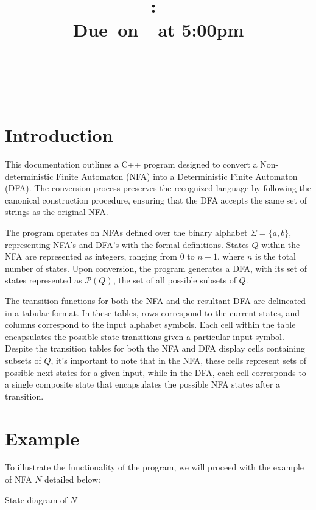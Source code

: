 \documentclass{article}
\title{
    \vspace{2in}
    \textmd{\textbf{\hmwkClass:\ \hmwkTitle}}\\
    \normalsize\vspace{0.1in}\small{Due\ on\ \hmwkDueDate\ at 5:00pm}\\
    \vspace{0.1in}\large{\textit{\hmwkClassInstructor}} \\
    \vspace{3in}
}
\author{
  \hmwkAuthorName \\
  \vspace{0.1in}\small\hmwkPID
}
\date{}
\begin{document}
\maketitle

\pagebreak

\section*{Introduction}

This documentation outlines a C++ program designed to convert a Non-deterministic Finite Automaton
(NFA) into a Deterministic Finite Automaton (DFA). The conversion process preserves the recognized
language by following the canonical construction procedure, ensuring that the DFA accepts the same
set of strings as the original NFA.

The program operates on NFAs defined over the binary alphabet $\Sigma = \{a, b\}$, representing
NFA's and DFA's with the formal definitions. States $Q$ within the NFA are represented as integers,
ranging from 0 to $n - 1$, where $n$ is the total number of states. Upon conversion, the program
generates a DFA, with its set of states represented as $\mathcal{P}(Q)$, the set of all possible
subsets of $Q$.

The transition functions for both the NFA and the resultant DFA are delineated in a tabular format.
In these tables, rows correspond to the current states, and columns correspond to the input alphabet
symbols. Each cell within the table encapsulates the possible state transitions given a particular
input symbol. Despite the transition tables for both the NFA and DFA display cells containing
subsets of $Q$, it's important to note that in the NFA, these cells represent sets of possible next
states for a given input, while in the DFA, each cell corresponds to a single composite state that
encapsulates the possible NFA states after a transition.

\section*{Example}

To illustrate the functionality of the program, we will proceed with the example of NFA $N$ detailed
below:

\begin{center}
  State diagram of $N$

\end{center}
\end{document}
